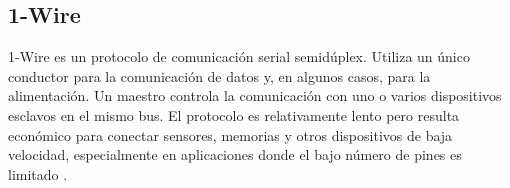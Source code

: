 \subsection{1-Wire}
1-Wire es un protocolo de comunicación serial semidúplex. Utiliza un único conductor para la comunicación de datos y, en algunos casos, para la alimentación. Un maestro controla la comunicación con uno o varios dispositivos esclavos en el mismo bus. El protocolo es relativamente lento pero resulta económico para conectar sensores, memorias y otros dispositivos de baja velocidad, especialmente en aplicaciones donde el bajo número de pines es limitado \cite{1WIRE}.










